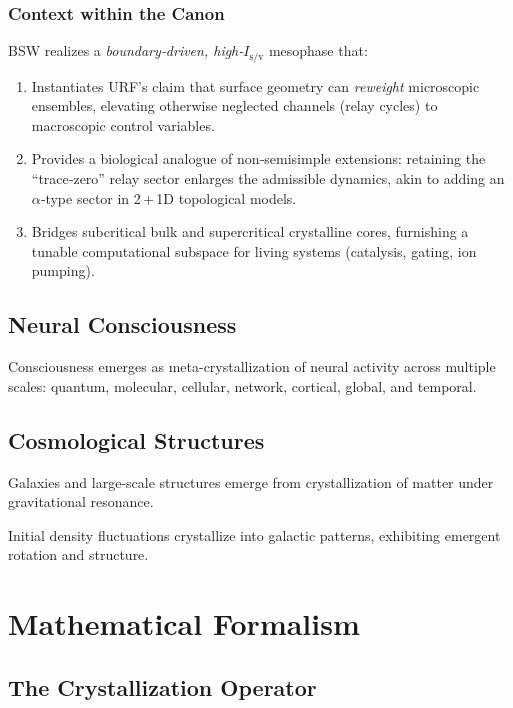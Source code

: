 \documentclass[12pt,oneside]{memoir}
\theoremstyle{plain}
\theoremstyle{definition}
\theoremstyle{remark}
\newcommand{\Isv}{\ensuremath{I_{\mathrm{s}/\mathrm{v}}}}
\begin{document}
\subsection{Context within the Canon}
BSW realizes a \emph{boundary‑driven, high‑\(\Isv\)} mesophase that:
\begin{enumerate}[label=\alph*) , leftmargin=1.1cm]
\item Instantiates URF’s claim that surface geometry can \emph{reweight} microscopic ensembles, elevating otherwise neglected channels (relay cycles) to macroscopic control variables.
\item Provides a biological analogue of non‑semisimple extensions: retaining the ``trace‑zero'' relay sector enlarges the admissible dynamics, akin to adding an \(\alpha\)‑type sector in 2\,+\,1D topological models.
\item Bridges subcritical bulk and supercritical crystalline cores, furnishing a tunable computational subspace for living systems (catalysis, gating, ion pumping).
\end{enumerate}

\section{Neural Consciousness}

Consciousness emerges as meta-crystallization of neural activity across multiple scales: quantum, molecular, cellular, network, cortical, global, and temporal.

\section{Cosmological Structures}

Galaxies and large-scale structures emerge from crystallization of matter under gravitational resonance.

Initial density fluctuations crystallize into galactic patterns, exhibiting emergent rotation and structure.

\chapter{Mathematical Formalism}

\section{The Crystallization Operator}
\end{document}
